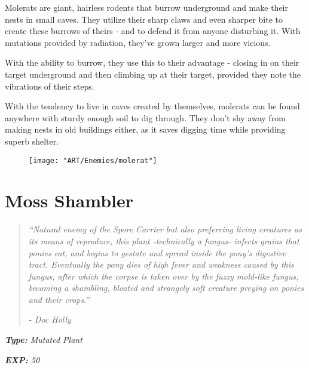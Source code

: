 \documentclass[11pt,a4paper,twocolumn]{book}
\begin{document}
	Molerats are giant, hairless rodents that burrow underground and make their nests in small caves. They utilize their sharp claws and even sharper bite to create these burrows of theirs - and to defend it from anyone disturbing it. With mutations provided by radiation, they've grown larger and more vicious.
	
	With the ability to burrow, they use this to their advantage - closing in on their target underground and then climbing up at their target, provided they note the vibrations of their steps.
	
	With the tendency to live in caves created by themselves, molerats can be found anywhere with sturdy enough soil to dig through. They don't shy away from making nests in old buildings either, as it saves digging time while providing superb shelter.
	
	\begin{figure}[h]
		\centering
		\texttt{[image: "ART/Enemies/molerat"]}
	\end{figure}
	
	\clearpage
	
	\section*{Moss Shambler}
	\begin{quote}
		\emph{``Natural enemy of the Spore Carrier but also preferring living creatures as its means of reproduce, this plant -technically a fungus-  infects grains that ponies eat, and begins to gestate and spread inside the pony's digestive tract. Eventually the pony dies of high fever and weakness caused by this fungus, after which the corpse is taken over by the fuzzy mold-like fungus, becoming a shambling, bloated and strangely soft creature preying on ponies and their crops.''}
		
		\emph{-	Doc Holly}
	\end{quote}
	
	\noindent
	\emph{\textbf{Type:} Mutated Plant}
	
	\noindent
	\emph{\textbf{EXP:} 50}
	
\end{document}
